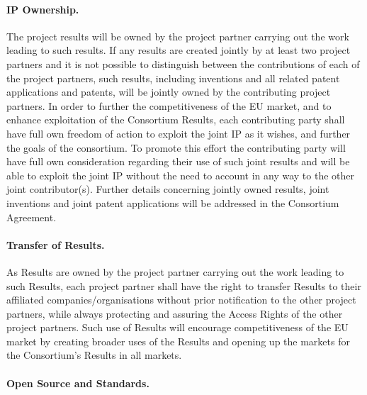 \documentclass[a4paper,11pt]{article}
\begin{document}


\paragraph{IP Ownership.}

The project results will be owned by the project partner carrying out the work leading to such results. If any results are created jointly by at least two project partners and it is not possible to distinguish between the contributions of each of the project partners, such results, including inventions and all related patent applications and patents, will be jointly owned by the contributing project partners. In order to further the competitiveness of the EU market, and to enhance exploitation of the Consortium Results, each contributing party shall have full own freedom of action to exploit the joint IP as it wishes, and further the goals of the consortium. To promote this effort the contributing party will have full own consideration regarding their use of such joint results and will be able to exploit the joint IP without the need to account in any way to the other joint contributor(s). Further details concerning jointly owned results, joint inventions and joint patent applications will be addressed in the Consortium Agreement.

\paragraph{Transfer of Results.}

As Results are owned by the project partner carrying out the work leading
to such Results, each project partner shall have the right to transfer
Results to their affiliated companies/organisations without prior notification to the
other project partners, while always protecting and assuring the Access
Rights of the other project partners.  Such use of Results will encourage
competitiveness of the EU market by creating broader uses of the Results
and opening up the markets for the Consortium's Results in all markets.

\paragraph{Open Source and Standards.}
\end{document}
